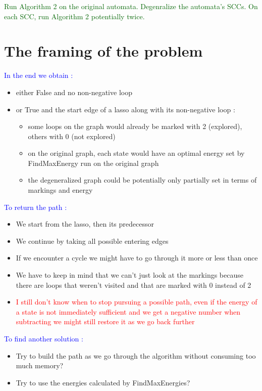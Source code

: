 \documentclass{rapport}
\begin{document}
\vspace{12pt}

\textcolor[HTML]{006400}{Run Algorithm 2 on the original automata. Degenralize the automata’s SCCs. On each SCC, run Algorithm 2 potentially twice.}\\

\newpage

\section{The framing of the problem}

\textcolor{blue}{In the end we obtain :}\\
\begin{itemize}
    \item either False and no non-negative loop
    \item or True and the start edge of a lasso along with its non-negative loop :
    \begin{itemize}
        \item some loops on the graph would already be marked with 2 (explored), others with 0 (not explored)
        \item on the original graph, each state would have an optimal energy set by FindMaxEnergy run on the original graph
        \item the degeneralized graph could be potentially only partially set in terms of markings and energy
    \end{itemize}
\end{itemize}

\vspace{12pt}

\textcolor{blue}{To return the path :}\\
\begin{itemize}
    \item We start from the lasso, then its predecessor
    \item We continue by taking all possible entering edges
    \item If we encounter a cycle we might have to go through it more or less than once
    \item We have to keep in mind that we can't just look at the markings because there are loops that weren't visited and that are marked with 0 instead of 2
    \item \textcolor{red}{I still don’t know when to stop pursuing a possible path, even if the energy of a state is not immediately sufficient and we get a negative number when subtracting we might still restore it as we go back further}
\end{itemize}

\vspace{12pt}

\textcolor{blue}{To find another solution :}\\
\begin{itemize}
    \item Try to build the path as we go through the algorithm without consuming too much memory?
    \item Try to use the energies calculated by FindMaxEnergies?
\end{itemize}
\end{document}

